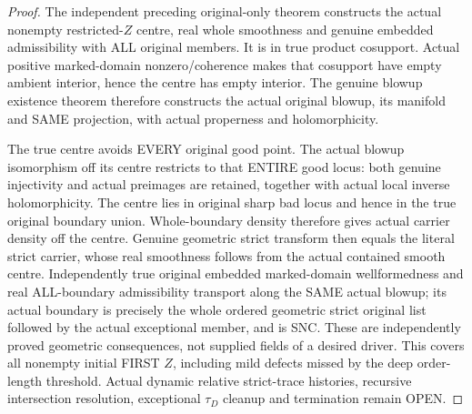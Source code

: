 \begin{proof}
The independent preceding original-only theorem constructs the actual
nonempty restricted-$Z$ centre, real whole smoothness and genuine embedded
admissibility with ALL original members. It is in true product cosupport.
Actual positive marked-domain nonzero/coherence makes that cosupport have
empty ambient interior, hence the centre has empty interior. The genuine
blowup existence theorem therefore constructs the actual original blowup,
its manifold and SAME projection, with actual properness and holomorphicity.

The true centre avoids EVERY original good point. The actual blowup
isomorphism off its centre restricts to that ENTIRE good locus: both genuine
injectivity and actual preimages are retained, together with actual local
inverse holomorphicity. The centre lies in original sharp bad locus and hence
in the true original boundary union. Whole-boundary density therefore gives
actual carrier density off the centre. Genuine geometric strict transform
then equals the literal strict carrier, whose real smoothness follows from
the actual contained smooth centre. Independently true original embedded
marked-domain wellformedness and real ALL-boundary admissibility transport
along the SAME actual blowup; its actual boundary is precisely the whole
ordered geometric strict original list followed by the actual exceptional
member, and is SNC. These are independently proved geometric consequences,
not supplied fields of a desired driver. This covers all nonempty initial
FIRST $Z$, including mild defects missed by the deep order-length threshold.
Actual dynamic relative strict-trace histories, recursive intersection
resolution, exceptional $\tau_D$ cleanup and termination remain OPEN.
\end{proof}
